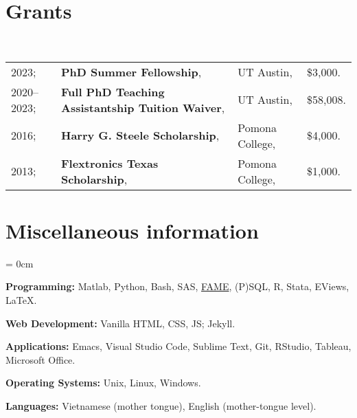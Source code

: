 \documentclass[a4paper, 10pt]{article}
\begin{document}
  \section{Grants}
  ~\begin{tabular}{llll}
    2023; & \textbf{PhD Summer Fellowship}, & UT Austin, & \$3,000.\\
    2020--2023; & \textbf{Full PhD Teaching Assistantship Tuition Waiver}, & UT Austin, & \$58,008.\\
    2016; & \textbf{Harry G. Steele Scholarship}, & Pomona College, & \$4,000.\\
    2013; & \textbf{Flextronics Texas Scholarship}, & Pomona College, & \$1,000.
  \end{tabular}
  \vspace*{0.25em}
    
  \section{Miscellaneous information}
  \begin{compactitem}\parskip = 0cm
    \item \textbf{Programming:} Matlab, Python, Bash, SAS, \href{https://en.wikipedia.org/wiki/FAME_(database)}{FAME}, (P)SQL, R, Stata, EViews, \LaTeX.
    \item \textbf{Web Development:} Vanilla HTML, CSS, JS; Jekyll.
    \item \textbf{Applications:} Emacs, Visual Studio Code, Sublime Text, Git, RStudio, Tableau, Microsoft Office.
    \item \textbf{Operating Systems:} Unix, Linux, Windows.
    \item \textbf{Languages:} Vietnamese (mother tongue), English (mother-tongue level).
  \end{compactitem}
\end{document}
